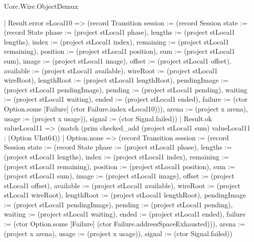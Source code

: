 \begin{lexlean}{Uorc.Wire.ObjectDemux}
\begin{semanticmodule}
{          | Result.error eLocal10 => (record Transition {session := (record Session {state := (record State {phase := (project stLocal1 phase), lengths := (project stLocal1 lengths), index := (project stLocal1 index), remaining := (project stLocal1 remaining), position := (project stLocal1 position), sum := (project stLocal1 sum), image := (project stLocal1 image), offset := (project stLocal1 offset), available := (project stLocal1 available), wireRoot := (project stLocal1 wireRoot), lengthRoot := (project stLocal1 lengthRoot), pendingImage := (project stLocal1 pendingImage), pending := (project stLocal1 pending), waiting := (project stLocal1 waiting), ended := (project stLocal1 ended), failure := (ctor Option.some [Failure] (ctor Failure.index eLocal10))}), arena := (project x arena), usage := (project x usage)}), signal := (ctor Signal.failed)})
          | Result.ok valueLocal11 => (match (prim checked_add (project stLocal1 sum) valueLocal11 : (Option UInt64))
            | Option.none => (record Transition {session := (record Session {state := (record State {phase := (project stLocal1 phase), lengths := (project stLocal1 lengths), index := (project stLocal1 index), remaining := (project stLocal1 remaining), position := (project stLocal1 position), sum := (project stLocal1 sum), image := (project stLocal1 image), offset := (project stLocal1 offset), available := (project stLocal1 available), wireRoot := (project stLocal1 wireRoot), lengthRoot := (project stLocal1 lengthRoot), pendingImage := (project stLocal1 pendingImage), pending := (project stLocal1 pending), waiting := (project stLocal1 waiting), ended := (project stLocal1 ended), failure := (ctor Option.some [Failure] (ctor Failure.addressSpaceExhausted))}), arena := (project x arena), usage := (project x usage)}), signal := (ctor Signal.failed)})
}
\end{semanticmodule}
\end{lexlean}
